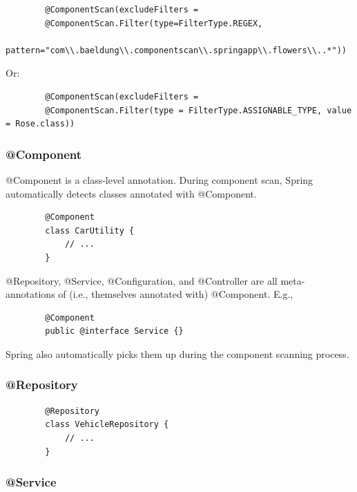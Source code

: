 \documentclass{scrartcl}
\begin{document}
    \begin{lstlisting}
        @ComponentScan(excludeFilters =
        @ComponentScan.Filter(type=FilterType.REGEX,
        pattern="com\\.baeldung\\.componentscan\\.springapp\\.flowers\\..*"))
    \end{lstlisting}

    Or:
    \begin{lstlisting}
        @ComponentScan(excludeFilters =
        @ComponentScan.Filter(type = FilterType.ASSIGNABLE_TYPE, value = Rose.class))
    \end{lstlisting}

\subsubsection{@Component}

    @Component is a class-level annotation. During component scan, Spring automatically detects classes annotated with @Component.

    \begin{lstlisting}
        @Component
        class CarUtility {
            // ...
        }
    \end{lstlisting}

    @Repository, @Service, @Configuration, and @Controller are all meta-annotations of (i.e., themselves annotated with) @Component. E.g.,

      \begin{lstlisting}
        @Component
        public @interface Service {}
    \end{lstlisting}

    Spring also automatically picks them up during the component scanning process.


\subsubsection{@Repository}

    \begin{lstlisting}
        @Repository
        class VehicleRepository {
            // ...
        }
    \end{lstlisting}

\subsubsection{@Service}
\end{document}
